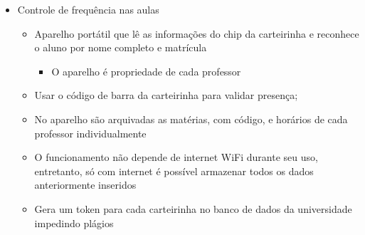 \begin{apendicesenv}
\begin{itemize}
\begin{itemize}
\begin{itemize}
        \end{itemize}
      \end{itemize}
    \item Controle de frequência nas aulas
      \begin{itemize}
        \item Aparelho portátil que lê as informações do chip da carteirinha e reconhece o aluno por nome completo e matrícula
        \begin{itemize}
        \item O aparelho é propriedade de cada professor
        \end{itemize}
        \item Usar o código de barra da carteirinha para validar presença;
        \item No aparelho são arquivadas as matérias, com código, e horários de cada professor individualmente
        \item O funcionamento não depende de internet WiFi durante seu uso, entretanto, só com internet é possível armazenar todos os dados anteriormente inseridos
        \item Gera um token para cada carteirinha no banco de dados da universidade impedindo plágios
      \end{itemize}
  \end{itemize}

\end{apendicesenv}
